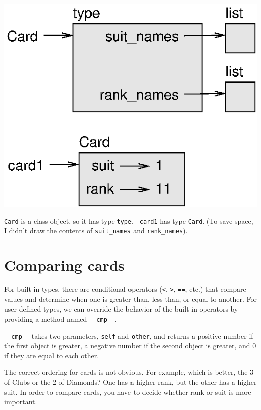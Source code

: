 \documentclass[10pt]{book}
\begin{document}

\beforefig
\centerline{\includegraphics{figs/card1.eps}}
\afterfig

{\tt Card} is a class object, so it has type {\tt type}.  {\tt
card1} has type {\tt Card}.  (To save space, I didn't draw the
contents of \verb"suit_names" and \verb"rank_names").


\section{Comparing cards}
\label{comparecard}


For built-in types, there are conditional operators
({\tt <}, {\tt >}, {\tt ==}, etc.)
that compare
values and determine when one is greater than, less than, or equal to
another.  For user-defined types, we can override the behavior of
the built-in operators by providing a method named
\verb"__cmp__".  

\verb"__cmp__" takes two parameters, {\tt self} and {\tt other},
and returns a positive number if the first object is greater, a
negative number if the second object is greater, and 0 if they are
equal to each other.


The correct ordering for cards is not obvious.
For example, which
is better, the 3 of Clubs or the 2 of Diamonds?  One has a higher
rank, but the other has a higher suit.  In order to compare
cards, you have to decide whether rank or suit is more important.
\end{document}
